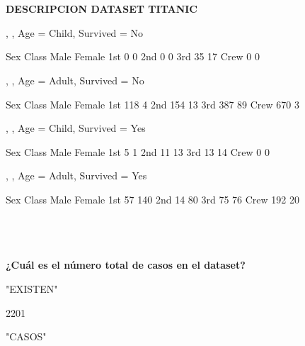 \documentclass[11pt]{report}
\begin{document}
\\\\
\textbf{DESCRIPCION DATASET TITANIC}

\begin{Schunk}
\begin{Soutput}
, , Age = Child, Survived = No

      Sex
Class  Male Female
  1st     0      0
  2nd     0      0
  3rd    35     17
  Crew    0      0

, , Age = Adult, Survived = No

      Sex
Class  Male Female
  1st   118      4
  2nd   154     13
  3rd   387     89
  Crew  670      3

, , Age = Child, Survived = Yes

      Sex
Class  Male Female
  1st     5      1
  2nd    11     13
  3rd    13     14
  Crew    0      0

, , Age = Adult, Survived = Yes

      Sex
Class  Male Female
  1st    57    140
  2nd    14     80
  3rd    75     76
  Crew  192     20
\end{Soutput}
\end{Schunk}
  \\\\\\
\textbf{¿Cuál es el número total de casos en el dataset?}

\begin{Schunk}
\begin{Soutput}
[1] "EXISTEN"
\end{Soutput}
\begin{Soutput}
[1] 2201
\end{Soutput}
\begin{Soutput}
[1] "CASOS"
\end{Soutput}
\end{Schunk}
\end{document}
